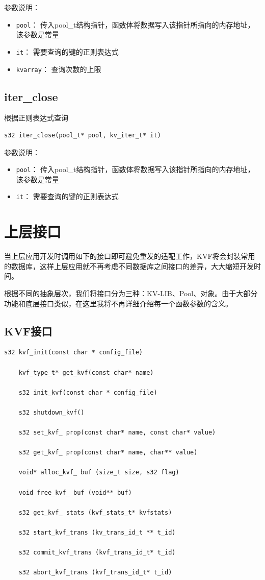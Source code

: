 		参数说明：
		\begin{itemize}
		\item \verb|pool|：
			传入pool\_t结构指针，函数体将数据写入该指针所指向的内存地址，该参数是常量
		\item \verb|it|：
			需要查询的键的正则表达式
		\item \verb|kvarray|：
			查询次数的上限
		
		\end{itemize}

		\subsection{iter\_close}
			根据正则表达式查询
		\begin{Verbatim}[frame = none]
    s32 iter_close(pool_t* pool, kv_iter_t* it)
		\end{Verbatim}

		参数说明：
		\begin{itemize}
		\item \verb|pool|：
			传入pool\_t结构指针，函数体将数据写入该指针所指向的内存地址，该参数是常量
		\item \verb|it|：
			需要查询的键的正则表达式
		
		\end{itemize}

	\section{上层接口}
		当上层应用开发时调用如下的接口即可避免重发的适配工作，KVF将会封装常用的数据库，这样上层应用就不再考虑不同数据库之间接口的差异，大大缩短开发时间。

		根据不同的抽象层次，我们将接口分为三种：KV-LIB、Pool、对象。由于大部分功能和底层接口类似，在这里我将不再详细介绍每一个函数参数的含义。
		\subsection{KVF接口}

			\begin{Verbatim}[frame = none]
    s32 kvf_init(const char * config_file) 

    kvf_type_t* get_kvf(const char* name)

    s32 init_kvf(const char * config_file)

    s32 shutdown_kvf()

    s32 set_kvf_ prop(const char* name, const char* value)

    s32 get_kvf_ prop(const char* name, char** value)

    void* alloc_kvf_ buf (size_t size, s32 flag)

    void free_kvf_ buf (void** buf)

    s32 get_kvf_ stats (kvf_stats_t* kvfstats)

    s32 start_kvf_trans (kv_trans_id_t ** t_id)

    s32 commit_kvf_trans (kvf_trans_id_t* t_id)
    
    s32 abort_kvf_trans (kvf_trans_id_t* t_id)
			\end{Verbatim}

